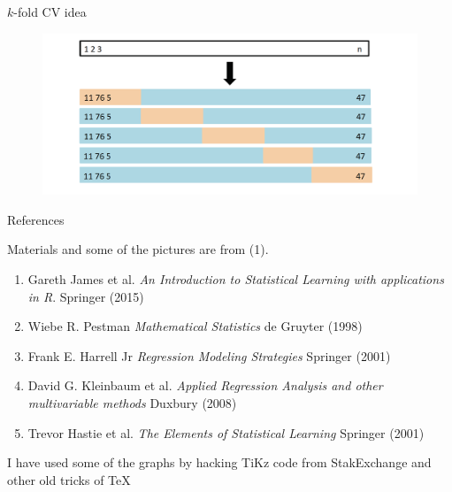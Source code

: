 \documentclass{beamer}
\begin{document}
\begin{frame}{$k$-fold CV idea}
	\begin{figure}
		\centering
		\includegraphics[scale=0.35]{../../Figures/fig_kfoldcv.png}
	\end{figure}	
\end{frame}

\begin{frame}{References}
	
Materials and some of the pictures are from (1).
	\begin{enumerate}
\item Gareth James et al. {\it An Introduction to Statistical Learning with applications in R}. Springer (2015)
\item Wiebe R. Pestman {\it Mathematical Statistics} de Gruyter (1998)
\item Frank E. Harrell Jr {\it Regression Modeling Strategies} Springer (2001)
\item David G. Kleinbaum et al. {\it Applied Regression Analysis and other multivariable methods} Duxbury (2008)
\item Trevor Hastie et al. {\it The Elements of Statistical Learning} Springer (2001)	
\end{enumerate}	

I have used some of the graphs by hacking TiKz code from StakExchange and other old tricks of \TeX
\end{frame}		
\end{document}
